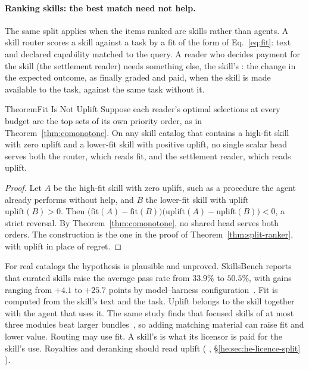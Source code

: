 \paragraph{Ranking skills: the best match need not help.}
The same split applies when the items ranked are skills rather than agents.
A skill router scores a skill against a task by a fit of the form of
Eq.~\ref{eq:fit}: text and declared capability matched to the query. A
reader who decides payment for the skill (the settlement reader) needs
something else, the skill's : the change in the expected outcome,
as finally graded and paid, when the skill is made available to the
task, against the same task without it.

\begin{pdclaim}{Theorem}{Fit Is Not Uplift}
\setlength{\parskip}{4pt plus 1pt}
\label{thm:ls-fit-uplift}
Suppose each reader's optimal selections at every budget are the top sets
of its own priority order, as in Theorem~\ref{thm:comonotone}. On any skill
catalog that contains a high-fit skill with zero uplift and a lower-fit
skill with positive uplift, no single scalar head serves both the router,
which reads fit, and the settlement reader, which reads uplift.
\end{pdclaim}
\begin{proof}
\setlength{\parskip}{4pt plus 1pt}
Let $A$ be the high-fit skill with zero uplift, such as a procedure the
agent already performs without help, and $B$ the lower-fit skill with
uplift $\mathrm{uplift}(B)>0$. Then
$\bigl(\mathrm{fit}(A)-\mathrm{fit}(B)\bigr)\bigl(\mathrm{uplift}(A)-\mathrm{uplift}(B)\bigr)<0$, a
strict reversal. By Theorem~\ref{thm:comonotone}, no shared head serves
both orders. The construction is the one in the proof of
Theorem~\ref{thm:split-ranker}, with uplift in place of regret.
\end{proof}

\noindent For real catalogs the hypothesis is plausible and unproved.
SkillsBench reports that curated skills raise the average pass rate from
$33.9\%$ to $50.5\%$, with gains ranging from $+4.1$ to $+25.7$ points by
model--harness configuration~. Fit is computed
from the skill's text and the task. Uplift belongs to the skill together
with the agent that uses it. The same study finds that focused skills of
at most three modules beat larger bundles~, so
adding matching material can raise fit and lower value. Routing may use
fit. A skill's  is what its licensor is paid for the skill's
use. Royalties and deranking should read uplift
(%
\ifpdbook
, \S\ref{he:sec:he-licence-split}%
\fi
).
